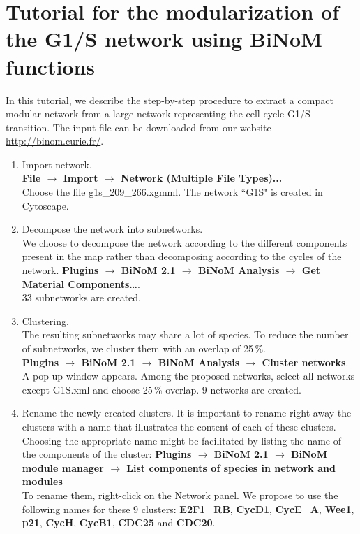 \documentclass[a4paper,10pt]{article}
\begin{document}
\section*{Tutorial for the modularization of the G1/S network using BiNoM functions}
In this tutorial, we describe the step-by-step procedure to extract a compact
modular network from a large network representing the cell cycle G1/S
transition. The input file can be downloaded from our website
\url{http://binom.curie.fr/}.
\begin{enumerate}
\item Import network. \\
\textbf{File $\rightarrow$ Import $\rightarrow$ Network (Multiple File Types)...}\\
Choose the file g1s\_209\_266.xgmml.
The network ``G1S" is created in Cytoscape.


\item	Decompose the network into subnetworks. \\
We choose to decompose the network according to the different components present
in the map rather than decomposing according to the cycles of the network. 
\textbf{Plugins $\rightarrow$ BiNoM 2.1 $\rightarrow$ BiNoM Analysis $\rightarrow$ Get Material
Components…}.\\
33 subnetworks are created.

\item	Clustering. \\
The resulting subnetworks may share a lot of species. To reduce the number of
subnetworks, we cluster them with an overlap of 25\,\%. \\
\textbf{Plugins $\rightarrow$  BiNoM 2.1 $\rightarrow$ BiNoM Analysis $\rightarrow$ Cluster networks}. \\
A pop-up window appears. Among the proposed networks, select all networks except
G1S.xml and choose 25\,\% overlap. 9 networks are created.

\item	Rename the newly-created clusters.
It is important to rename right away the clusters with a name that illustrates
the content of each of these clusters. 
Choosing the appropriate name might be facilitated by listing the name of the
components of the cluster: \textbf{Plugins $\rightarrow$  BiNoM 2.1 $\rightarrow$ BiNoM module manager
$\rightarrow$ List components of species in network and modules} \\
To rename them, right-click on the Network panel.
We propose to use the following names for these 9 clusters: \textbf{E2F1\_RB},
\textbf{CycD1}, \textbf{CycE\_A}, \textbf{Wee1}, \textbf{p21}, \textbf{CycH}, \textbf{CycB1}, \textbf{CDC25} and \textbf{CDC20}.


\end{enumerate}
\end{document}
